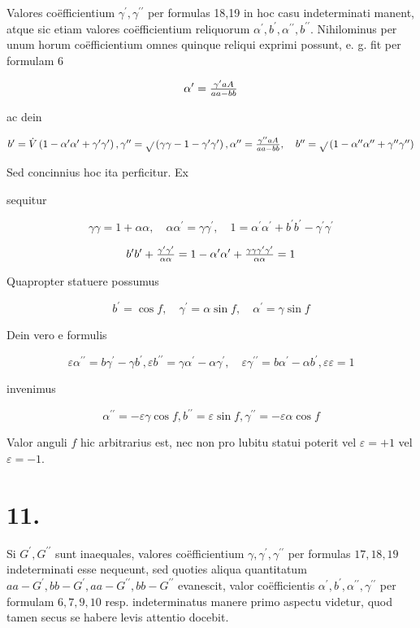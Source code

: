 \documentclass[twoside,12pt, showframe]{memoir}
\let\oldfrac\frac
\def\frac#1#2{\mathchoice{\tfrac{#1}{#2}}{\oldfrac{#1}{#2}}{\genfrac{}{}{}{2}{#1}{#2\mathstrut}}{\genfrac{}{}{}{3}{#1}{#2\mathstrut}}}
\begin{document}
Valores coëfficientium \(\gamma^{\prime}, \gamma^{\prime \prime}\) per formulas 18,19 in hoc casu indeterminati manent, atque sic etiam valores coëfficientium reliquorum \(\alpha^{\prime}, b^{\prime}, \alpha^{\prime \prime}, b^{\prime \prime}\). Nihilominus per unum horum coëfficientium omnes quinque reliqui exprimi possunt, e. g. fit per formulam 6

\[
\alpha^{\prime}=\frac{\gamma^{\prime} a A}{a a-b b}
\]

ac dein

\(b^{\prime}=\dot{V}\left(1-\alpha^{\prime} \alpha^{\prime}+\gamma^{\prime} \gamma^{\prime}\right), \gamma^{\prime \prime}=\sqrt{ }\left(\gamma \gamma-1-\gamma^{\prime} \gamma^{\prime}\right), \alpha^{\prime \prime}=\frac{\gamma^{\prime \prime} a A}{a a-b b}, \quad b^{\prime \prime}=\sqrt{ }\left(1-\alpha^{\prime \prime} \alpha^{\prime \prime}+\gamma^{\prime \prime} \gamma^{\prime \prime}\right)\)

Sed concinnius hoc ita perficitur. Ex

sequitur

\[
\gamma \gamma=1+\alpha \alpha, \quad \alpha \alpha^{\prime}=\gamma \gamma^{\prime}, \quad 1=\alpha^{\prime} \alpha^{\prime}+b^{\prime} b^{\prime}-\gamma^{\prime} \gamma^{\prime}
\]

\[
b^{\prime} b^{\prime}+\frac{\gamma^{\prime} \gamma^{\prime}}{\alpha \alpha}=1-\alpha^{\prime} \alpha^{\prime}+\frac{\gamma \gamma \gamma^{\prime} \gamma^{\prime}}{\alpha \alpha}=1
\]

Quapropter statuere possumus

\[
b^{\prime}=\cos f, \quad \gamma^{\prime}=\alpha \sin f, \quad \alpha^{\prime}=\gamma \sin f
\]

Dein vero e formulis

\[
\varepsilon \alpha^{\prime \prime}=b \gamma^{\prime}-\gamma b^{\prime}, \varepsilon b^{\prime \prime}=\gamma \alpha^{\prime}-\alpha \gamma^{\prime}, \quad \varepsilon \gamma^{\prime \prime}=b \alpha^{\prime}-\alpha b^{\prime}, \varepsilon \varepsilon=1
\]

invenimus

\[
\alpha^{\prime \prime}=-\varepsilon \gamma \cos f, b^{\prime \prime}=\varepsilon \sin f, \gamma^{\prime \prime}=-\varepsilon \alpha \cos f
\]

Valor anguli \(f\) hic arbitrarius est, nec non pro lubitu statui poterit vel \(\varepsilon=+1\) vel \(\varepsilon=-1\).

\section*{11.}
Si \(G^{\prime}, G^{\prime \prime}\) sunt inaequales, valores coëfficientium \(\gamma, \gamma^{\prime}, \gamma^{\prime \prime}\) per formulas \(17,18,19\) indeterminati esse nequeunt, sed quoties aliqua quantitatum
\(a a-G^{\prime}, b b-G^{\prime}, a a-G^{\prime \prime}, b b-G^{\prime \prime}\) evanescit, valor coëfficientis \(\alpha^{\prime}, b^{\prime}, \alpha^{\prime \prime}, \gamma^{\prime \prime}\) per formulam \(6,7,9,10\) resp. indeterminatus manere primo aspectu videtur, quod tamen secus se habere levis attentio docebit.
\end{document}
